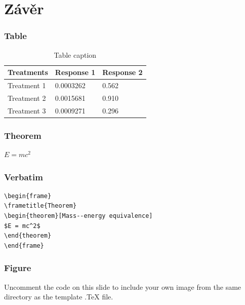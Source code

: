 \documentclass[mathserif]{beamer}
\begin{document}
\section{Závěr}

\begin{frame}
\frametitle{Table}
\begin{table}
\begin{tabular}{l l l}
\toprule
\textbf{Treatments} & \textbf{Response 1} & \textbf{Response 2}\\
\midrule
Treatment 1 & 0.0003262 & 0.562 \\
Treatment 2 & 0.0015681 & 0.910 \\
Treatment 3 & 0.0009271 & 0.296 \\
\bottomrule
\end{tabular}
\caption{Table caption}
\end{table}
\end{frame}


\begin{frame}
\frametitle{Theorem}
\begin{theorem}
$E = mc^2$
\end{theorem}
\end{frame}


\begin{frame}[fragile] %
\frametitle{Verbatim}
\begin{example}
\begin{verbatim}
\begin{frame}
\frametitle{Theorem}
\begin{theorem}[Mass--energy equivalence]
$E = mc^2$
\end{theorem}
\end{frame}\end{verbatim}
\end{example}
\end{frame}


\begin{frame}
\frametitle{Figure}
Uncomment the code on this slide to include your own image from the same directory as the template .TeX file.
\end{frame}
\end{document}
